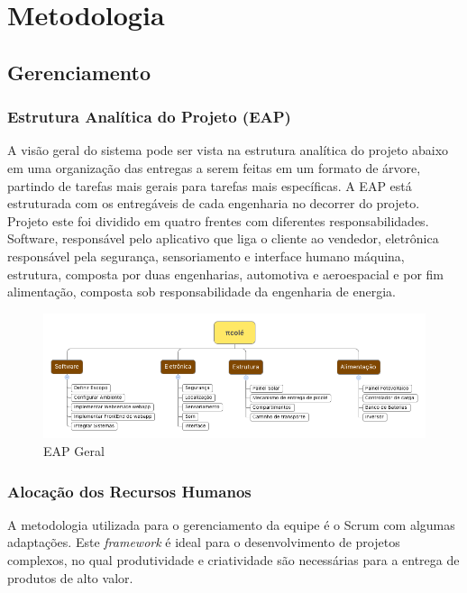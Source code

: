 \chapter{Metodologia}
\section{Gerenciamento}

\subsection{Estrutura Analítica do Projeto (EAP)}

A visão geral do sistema pode ser vista na estrutura analítica do projeto abaixo em uma organização das entregas a serem feitas em um formato de árvore, partindo de tarefas mais gerais para tarefas mais específicas. A EAP está estruturada com os entregáveis de cada engenharia no decorrer do projeto. Projeto este foi dividido em quatro frentes com diferentes responsabilidades. Software, responsável pelo aplicativo que liga o cliente ao vendedor, eletrônica responsável pela segurança, sensoriamento e interface humano máquina, estrutura, composta por duas engenharias, automotiva e aeroespacial e por fim alimentação, composta sob responsabilidade da engenharia de energia.  

\begin{figure}[H]
	\centering
    \includegraphics[width=\textwidth]{figuras/EAP_Geral}
    \caption{EAP Geral}
    \label{fig:EAP_Geral}
\end{figure}

\subsection{Alocação dos Recursos Humanos}
A metodologia utilizada para o gerenciamento da equipe é o Scrum com algumas adaptações. Este \textit{framework} é ideal para o desenvolvimento de projetos complexos, no qual produtividade e criatividade são necessárias para a entrega de produtos de alto valor.

